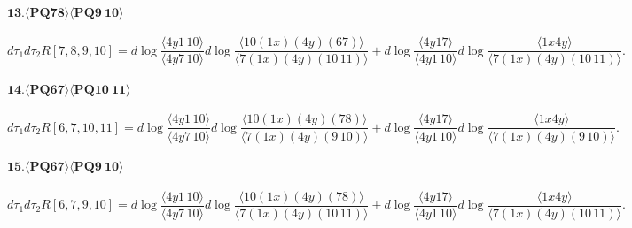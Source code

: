 \documentclass[10pt]{article}
\def\<{\langle}
\def\>{\rangle}
\begin{document}
\paragraph{$\mathbf{13.\<PQ78\>\<PQ9\ 10\>}$}
\[
    d\tau_1 d\tau_2 R[7,8,9,10]
    =d\log \frac{\<4y1\,10\>}{\<4y7\,10\>}d\log \frac{\<10(1x)(4y)(67)\>}{\<7(1x)(4y)(10\,11)\>}
    +d\log \frac{\<4y17\>}{\<4y1\, 10\>}d\log \frac{\<1x4y\>}{\<7(1x)(4y)(10\, 11)\>}.
\]
\paragraph{$\mathbf{14.\<PQ67\>\<PQ10\ 11\>}$}
\[
    d\tau_1 d\tau_2 R[6,7,10,11]
    =d\log \frac{\<4y1\,10\>}{\<4y7\,10\>}d\log \frac{\<10(1x)(4y)(78)\>}{\<7(1x)(4y)(9\,10)\>}
    +d\log \frac{\<4y17\>}{\<4y1\, 10\>}d\log \frac{\<1x4y\>}{\<7(1x)(4y)(9\,10)\>}.
\]
\paragraph{$\mathbf{15.\<PQ67\>\<PQ9\ 10\>}$}
\[
    d\tau_1 d\tau_2 R[6,7,9,10]
    =d\log \frac{\<4y1\,10\>}{\<4y7\,10\>}d\log \frac{\<10(1x)(4y)(78)\>}{\<7(1x)(4y)(10\,11)\>}
    +d\log \frac{\<4y17\>}{\<4y1\, 10\>}d\log \frac{\<1x4y\>}{\<7(1x)(4y)(10\, 11)\>}.
\]
\end{document}
